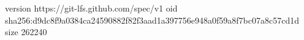 version https://git-lfs.github.com/spec/v1
oid sha256:d9dc8f9a0384ca24590882f82f3aad1a397756e948a0f59a8f7bc07a8c57cd1d
size 262240
